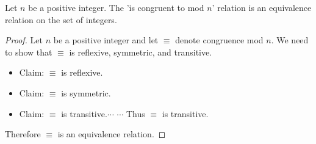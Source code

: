 \documentclass{beamer}
\def\itemb{\begin{itemize}}
\def\iteme{\end{itemize}}
\begin{document}
\begin{frame}
\begin{Theorem}
Let $n$ be a positive integer. The 'is congruent to mod $n$' relation is an equivalence relation on the set of integers.
\end{Theorem}
\begin{proof}
Let $n$ be a positive integer and let $\equiv$ denote congruence mod $n$. We need to show that $\equiv$ is reflexive, symmetric, and transitive.
\itemb
\item Claim: $\equiv$ is reflexive.   
\item Claim: $\equiv$ is symmetric.\only<5>{\color{blue}}
\item \color{black}Claim: $\equiv$ is transitive.$\cdots$ $\cdots$ Thus $\equiv$ is transitive.
\iteme
Therefore $\equiv$ is an equivalence relation.
\end{proof}
\end{frame}
\end{document}
